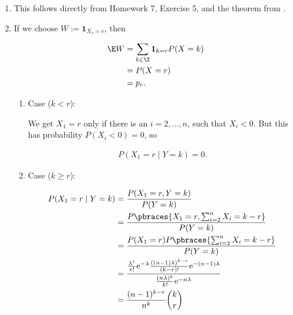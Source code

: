 \begin{solution}

\phantom{}

\begin{enumerate}[label = (\alph*)]

    \item This follows directly from Homework 7, Exercise 5, and the theorem from \cite[lecture, 8, slide 48]{EStat}.
    
    \item If we choose $W := \mathbf 1_{X_1 = r}$, then
    
    \begin{align*}
        \E W
        & =
        \sum_{k \in \Z}
            \mathbf 1_{k = r}
            P(X = k) \\
        & =
        P(X = r) \\
        & =
        p_r.
    \end{align*}

    \begin{enumerate}[label = \arabic*.]

        \item Case ($k < r$):

        We get $X_1 = r$ only if there is an $i = 2, \dots, n$, such that $X_i < 0$.
        But this has probability $P(X_i < 0) = 0$, so

        \begin{align*}
            P(X_1 = r \mid Y = k) = 0.
        \end{align*}

        \item Case ($k \geq r$):
        
        \begin{align*}
            P(X_1 = r \mid Y = k)
            & =
            \frac
            {
                P(X_1 = r, Y = k)
            }{
                P(Y = k)
            } \\
            & =
            \frac
            {
                P
                \pbraces
                {
                    X_1 = r,
                    \sum_{i=2}^n X_i = k - r
                }
            }{
                P(Y = k)
            } \\
            & =
            \frac
            {
                P(X_1 = r)
                P \pbraces{\sum_{i=2}^n X_i = k - r}
            }{
                P(Y = k)
            } \\
            & =
            \frac
            {
                \frac{\lambda^r}{r!} \mathrm e^{-\lambda}
                \frac
                {
                    ((n - 1) \lambda)^{k - r}
                }{
                    (k - r)!
                }
                \mathrm e^{-(n-1) \lambda}
            }{
                \frac{(n \lambda)^k}{k!} \mathrm e^{-n \lambda}
            } \\
            & =
            \frac{(n - 1)^{k - r}}{n^k}
            \binom{k}{r}
        \end{align*}


\end{enumerate}
\end{enumerate}
\end{solution}
